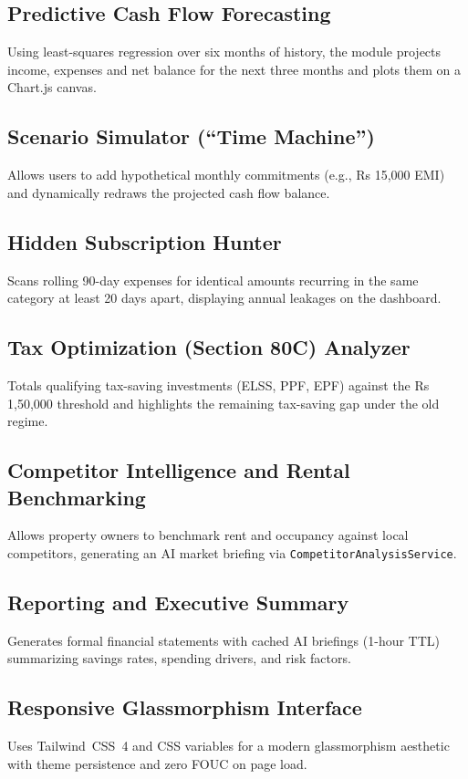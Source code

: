 \documentclass[12pt,a4paper]{report}
\newcommand{\TW}{Tailwind~CSS~4}
\begin{document}
\subsection{Predictive Cash Flow Forecasting}\label{s4317}
Using least-squares regression over six months of history, the module projects income, expenses and net balance for the next three months and plots them on a Chart.js canvas.

\subsection{Scenario Simulator (``Time Machine'')}\label{s4318}
Allows users to add hypothetical monthly commitments (e.g., Rs 15,000 EMI) and dynamically redraws the projected cash flow balance.

\subsection{Hidden Subscription Hunter}\label{s4319}
Scans rolling 90-day expenses for identical amounts recurring in the same category at least 20 days apart, displaying annual leakages on the dashboard.

\subsection{Tax Optimization (Section 80C) Analyzer}\label{s4320}
Totals qualifying tax-saving investments (ELSS, PPF, EPF) against the Rs 1,50,000 threshold and highlights the remaining tax-saving gap under the old regime.

\subsection{Competitor Intelligence and Rental Benchmarking}\label{s4321}
Allows property owners to benchmark rent and occupancy against local competitors, generating an AI market briefing via \texttt{CompetitorAnalysisService}.

\subsection{Reporting and Executive Summary}\label{s4322}
Generates formal financial statements with cached AI briefings (1-hour TTL) summarizing savings rates, spending drivers, and risk factors.

\subsection{Responsive Glassmorphism Interface}\label{s4323}
Uses \TW{} and CSS variables for a modern glassmorphism aesthetic with theme persistence and zero FOUC on page load.
\end{document}
